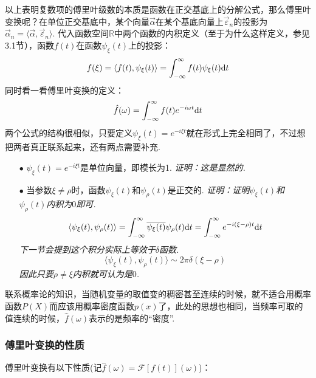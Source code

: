 \documentclass[main.tex]{subfiles}
\begin{document}
以上表明复数项的傅里叶级数的本质是函数在正交基底上的分解公式，那么傅里叶变换呢？在单位正交基底中，某个向量\(\vec{\alpha}\)在某个基底向量上\(\vec{\varepsilon}_n\)的投影为\(\vec{\alpha}_n = \langle \vec{\alpha},\vec{\varepsilon}_n \rangle\). 代入函数空间\(\mathbb{R}\)中两个函数的内积定义（至于为什么这样定义，参见3.1节），函数\(f(t)\)在函数\(\psi_{\xi}(t)\)上的投影：
\[f(\xi) = \langle f(t), \psi_{\xi}(t) \rangle = \int_{-\infty}^{\infty}f(t)\psi_{\xi}(t){\rm d}t\]
同时看一看傅里叶变换的定义：
\[\hat{f}(\omega) = \int_{-\infty}^{\infty}f(t)e^{-i\omega t}{\rm d}t\]
两个公式的结构很相似，只要定义\(\psi_{\xi}(t)=e^{-i\xi t}\)就在形式上完全相同了，不过想把两者真正联系起来，还有两点需要补充.
\begin{itemize}
    \item [\(\bullet\)] \(\psi_{\xi}(t)=e^{-i\xi t}\)是单位向量，即模长为1. 
    \newline
    \textit{
        证明：这是显然的.
    }
    \item [\(\bullet\)] 当参数\(\xi\neq\rho\)时，函数\(\psi_{\xi}(t)\)和\(\psi_{\rho}(t)\)是正交的. 
    \newline
    \textit{
        证明：证明\(\psi_{\xi}(t)\)和\(\psi_{\rho}(t)\)内积为\(0\)即可.
        \[\langle \psi_{\xi}(t),\psi_{\rho}(t) \rangle = \int_{-\infty}^{\infty}\overline{\psi_{\xi}(t)}\psi_{\rho}(t){\rm d}t = \int_{-\infty}^{\infty}e^{-i(\xi-\rho)t}{\rm d}t\]
        下一节会提到这个积分实际上等效于\(\delta\)函数.
        \[\langle \psi_{\xi}(t),\psi_{\rho}(t) \rangle \sim 2\pi\delta(\xi-\rho)\]
        因此只要\(\rho \neq \xi\)内积就可认为是\(0\).
    }
\end{itemize}

联系概率论的知识，当随机变量的取值变的稠密甚至连续的时候，就不适合用概率函数\(P(X)\)而应该用概率密度函数\(p(x)\)了，此处的思想也相同，当频率可取的值连续的时候，\(\hat{f}(\omega)\)表示的是频率的“密度”.

\subsubsection{傅里叶变换的性质}

傅里叶变换有以下性质(记\(\hat{f}(\omega)=\mathcal{F}[f(t)](\omega)\))：\\
\end{document}
